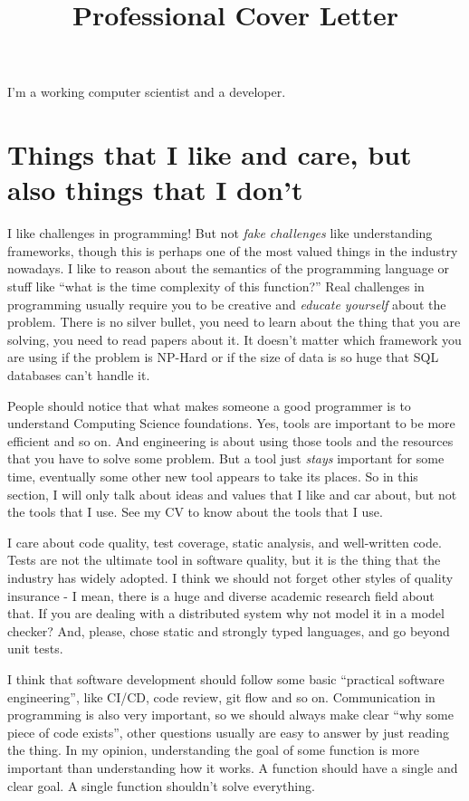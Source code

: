 \documentclass[11pt,a4paper,sans]{moderncv}
\title{Professional Cover Letter}
\begin{document}
\makecvtitle %
I'm a working computer scientist and a developer.

\section{Things that I like and care, but also things that I don't}
I like challenges in programming! But not \textit{fake challenges}
like understanding frameworks, though this is perhaps one of the most
valued things in the industry nowadays.  I like to reason about the
semantics of the programming language or stuff like ``what is the time
complexity of this function?''  Real challenges in programming usually
require you to be creative and \textit{educate yourself} about the
problem.  There is no silver bullet, you need to learn about the thing
that you are solving, you need to read papers about it. It doesn't matter
which framework you are using if the problem is NP-Hard or if the size of
data is so huge that SQL databases can't handle it.

People should notice that what makes someone a good programmer is to
understand Computing Science foundations.  Yes, tools are important to
be more efficient and so on.  And engineering is about using those
tools and the resources that you have to solve some problem.  But a
tool just \textit{stays} important for some time, eventually some other
new tool appears to take its places.  So in this section, I will only
talk about ideas and values that I like and car about, but not the
tools that I use.  See my CV to know about the tools that I use.

I care about code quality, test coverage, static analysis, and
well-written code. Tests are not the ultimate tool in software
quality, but it is the thing that the industry has widely adopted. I
think we should not forget other styles of quality insurance - I mean,
there is a huge and diverse academic research field about that.  If
you are dealing with a distributed system why not model it in a model
checker? And, please, chose static and strongly typed languages, and
go beyond unit tests.

I think that software development should follow some basic ``practical
software engineering'', like CI/CD, code review, git flow and so on.
Communication in programming is also very important, so we should
always make clear ``why some piece of code exists'', other questions
usually are easy to answer by just reading the thing. In my opinion,
understanding the goal of some function is more important than
understanding how it works. A function should have a single and clear
goal. A single function shouldn't solve everything.
\end{document}
